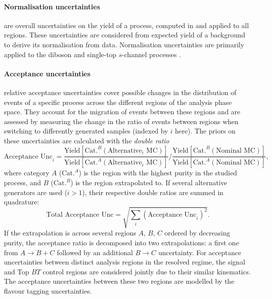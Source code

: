\paragraph{Normalisation uncertainties} are overall uncertainties on the yield of a process, computed in and applied to all regions. These uncertainties are considered from expected yield of a background to derive its normalisation from data. Normalisation uncertainties are primarily applied to the diboson and single-top $s$-channel processes .

\paragraph{Acceptance uncertainties} relative acceptance uncertainties cover possible changes in the distribution of events of a specific process across the different regions of the analysis phase space. They account for the migration of events between these regions and are assessed by measuring the change in the ratio of events between regions when switching to differently generated samples (indexed by $i$ here). The priors on these uncertainties are calculated with the \textit{double ratio} 
\begin{equation}\label{eq-doubleRatio}
    \text{Acceptance Unc}_i = \frac{\text{Yield}[\text{Cat.}^B (\mathrm{Alternative}_i\mathrm{\,\,MC})]}{\text{Yield}[\text{Cat.}^A (\mathrm{Alternative}_i\mathrm{\,\,MC})]} \Bigg/ \frac{\text{Yield}[\text{Cat.}^B (\mathrm{Nominal\,\,MC})]}{\text{Yield}[\text{Cat.}^A (\mathrm{Nominal\,\,MC})]},
\end{equation}
where category $A$ ($\text{Cat.}^A$) is the region with the highest purity in the studied process, and $B$ ($\text{Cat.}^B$) is the region extrapolated to. If several alternative generators are used ($i > 1$), their respective double ratios are summed in quadrature: \[ \text{Total Acceptance Unc} = \sqrt{\sum_i\left(\text{Acceptance Unc}_i\right)^2}.\] If the extrapolation is across several regions $A$, $B$, $C$ ordered by decreasing purity, the acceptance ratio is decomposed into two extrapolations: a first one from $A \rightarrow B+C$ followed by an additional $B \rightarrow C$ uncertainty. For acceptance uncertainties between distinct analysis regions in the resolved regime, the signal and Top $BT$ control regions are considered jointly due to their similar kinematics. The acceptance uncertainties between these two regions are modelled by the flavour tagging uncertainties.

